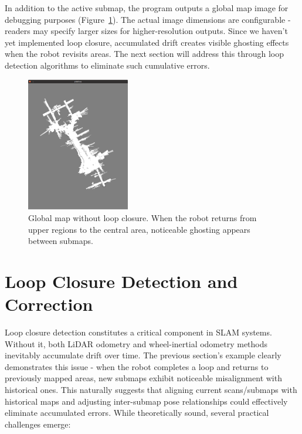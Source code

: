 In addition to the active submap, the program outputs a global map image for debugging purposes (Figure~\ref{fig:global-map-without-loop-closing}). The actual image dimensions are configurable - readers may specify larger sizes for higher-resolution outputs. Since we haven't yet implemented loop closure, accumulated drift creates visible ghosting effects when the robot revisits areas. The next section will address this through loop detection algorithms to eliminate such cumulative errors.

\begin{figure}[!t]
	\centering
	\includegraphics[width=0.4\textwidth]{resources/2d-lidar-mapping/global-map-without-loop-closing.png}
	\caption{Global map without loop closure. When the robot returns from upper regions to the central area, noticeable ghosting appears between submaps.}
	\label{fig:global-map-without-loop-closing}
\end{figure}

\section{Loop Closure Detection and Correction}
Loop closure detection constitutes a critical component in SLAM systems. Without it, both LiDAR odometry and wheel-inertial odometry methods inevitably accumulate drift over time. The previous section's example clearly demonstrates this issue - when the robot completes a loop and returns to previously mapped areas, new submaps exhibit noticeable misalignment with historical ones. This naturally suggests that aligning current scans/submaps with historical maps and adjusting inter-submap pose relationships could effectively eliminate accumulated errors. While theoretically sound, several practical challenges emerge:


